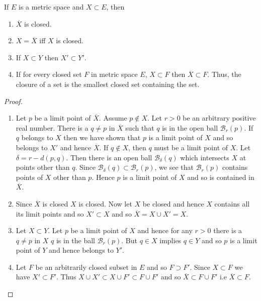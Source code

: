 \begin{Theorem}[name=Properties of closure]
    If $E$ is a metric space and $X \subset E$, then
    \begin{enumerate}
	\item $\overline{X}$ is closed.
	\item $X = \overline{X}$ iff $X$ is closed.
	\item If $X \subset Y$ then $X' \subset Y'$.
	\item If for every closed set $F$ in metric space $E$, $X \subset F$ then $\overline{X}
	    \subset F$. Thus, the closure of a set is the smallest closed set containing the set.
    \end{enumerate}
\end{Theorem}

\begin{proof}
    \begin{enumerate}
	\item Let $p$ be a limit point of $\overline{X}$. Assume $p \not \in X$. 
	    Let $r > 0$ be an arbitrary positive real number. There is a $q \neq p$ in $\overline{X}$
	    such that $q$ is in the open ball $\mathcal{B}_r(p)$. If $q$ belongs to $X$ then we have
	    shown that $p$ is a limit point of $X$ and so belongs to $X'$ and hence $\overline{X}$.
	    If $q \not \in X$, then $q$ must be a limit point of $X$. Let $\delta = r - d(p,q)$.
	    Then there is an open ball $\mathcal{B}_{\delta}(q)$ which intersects $X$ at points
	    other than $q$. Since $\mathcal{B}_{\delta}(q) \subset \mathcal{B}_r(p) $, we see that
	    $\mathcal{B}_r(p)$ contains points of $X$ other than $p$. Hence $p$ is a limit point of
	    $X$ and so is contained in $\overline{X}$.
	\item Since $\overline{X}$ is closed $X$ is closed. Now let $X$ be closed and hence $X$
	    contains all its limit points and so $X' \subset X$ and so $\overline{X} = X\cup X' =
	    X$.
	\item Let $X \subset Y$. Let $p$ be a limit point of $X$ and hence for any $r > 0$ 
	    there is a $q \neq p$ in $X$ $q$ is in the ball $\mathcal{B}_r(p)$. But $q \in X$
	    implies $q \in Y$ and so $p$ is a limit point of $Y$ and hence belongs to $Y'$.
	\item Let $F$ be an arbitrarily closed subset in $E$ and so $F \supset F'$. Since $X \subset
	    F$ we have $X' \subset F'$. Thus $X \cup X' \subset X \cup F' \subset F \cup F'$ and so
	    $\overline{X} \subset F \cup F'$ i.e $\overline{X} \subset F$. 
    \end{enumerate}
\end{proof}

